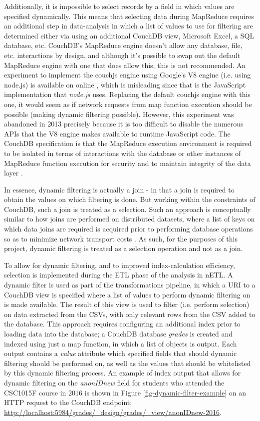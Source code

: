 Additionally, it is impossible to select records by a field in which values are specified dynamically. This means that selecting data during MapReduce requires an additional step in data-analysis in which a list of values to use for filtering are determined either via using an additional CouchDB view, Microsoft Excel, a SQL database, etc. CouchDB's MapReduce engine doesn't allow any database, file, etc. interactions by design, and although it's possible to swap out the default MapReduce engine with one that does allow this, this is not recommended. An experiment to implement the couchjs engine using Google's V8 engine (i.e. using node.js) is available on online \cite{v8couchjs}, which is misleading since that is the JavaScript implementation that \textit{node.js} uses. Replacing the default couchjs engine with this one, it would seem as if network requests from map function execution should be possible (making dynamic filtering possible). However, this experiment was abandoned in 2013 precisely because it is too difficult to disable the numerous APIs that the V8 engine makes available to runtime JavaScript code. The CouchDB specification is that the MapReduce execution environment is required to be isolated in terms of interactions with the database or other instances of MapReduce function execution for security and to maintain integrity of the data layer \cite{slack28Feb}.

In essence, dynamic filtering is actually a join - in that a join is required to obtain the values on which filtering is done. But working within the constraints of CouchDB, such a join is treated as a selection. Such an approach is conceptually similar to how joins are performed on distributed datasets, where a list of keys on which data joins are required is acquired prior to performing database operations so as to minimize network transport costs \cite{sonia2018}. As such, for the purposes of this project, dynamic filtering is treated as a selection operation and not as a join.

To allow for dynamic filtering, and to improved index-calculation efficiency, selection is implemented during the ETL phase of the analysis in nETL. A dynamic filter is used as part of the transformations pipeline, in which a URI to a CouchDB view is specified where a list of values to perform dynamic filtering on is made available. The result of this view is used to filter (i.e. perform selection) on data extracted from the CSVs, with only relevant rows from the CSV added to the database. This approach requires configuring an additional index prior to loading data into the database; a CouchDB database \textit{grades} is created and indexed using just a map function, in which a list of objects is output. Each output contains a \textit{value} attribute which specified fields that should dynamic filtering should be performed on, as well as the values that should be whitelisted by this dynamic filtering process. An example of index output that allows for dynamic filtering on the \textit{anonIDnew} field for students who attended the CSC1015F course in 2016 is shown in Figure \ref{fig-dynamic-filter-example} on an HTTP request to the CouchDB endpoint: \url{http://localhost:5984/grades/_design/grades/_view/anonIDnew-2016}.

